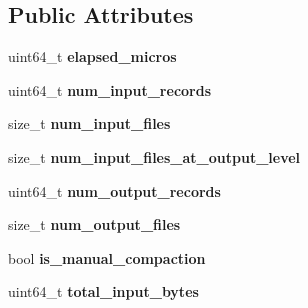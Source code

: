 \subsection*{Public Attributes}
\begin{DoxyCompactItemize}
\item 
uint64\+\_\+t {\bfseries elapsed\+\_\+micros}\hypertarget{structrocksdb_1_1CompactionJobStats_a6567d468a65804786f63cc4479be6c6f}{}\label{structrocksdb_1_1CompactionJobStats_a6567d468a65804786f63cc4479be6c6f}

\item 
uint64\+\_\+t {\bfseries num\+\_\+input\+\_\+records}\hypertarget{structrocksdb_1_1CompactionJobStats_aa59a71837c8db2b6d3fbd619d9abfa97}{}\label{structrocksdb_1_1CompactionJobStats_aa59a71837c8db2b6d3fbd619d9abfa97}

\item 
size\+\_\+t {\bfseries num\+\_\+input\+\_\+files}\hypertarget{structrocksdb_1_1CompactionJobStats_ad51b1dbb1097f47965e03a1f0df1dae0}{}\label{structrocksdb_1_1CompactionJobStats_ad51b1dbb1097f47965e03a1f0df1dae0}

\item 
size\+\_\+t {\bfseries num\+\_\+input\+\_\+files\+\_\+at\+\_\+output\+\_\+level}\hypertarget{structrocksdb_1_1CompactionJobStats_a4bd332cb2fd690781e28b45340819511}{}\label{structrocksdb_1_1CompactionJobStats_a4bd332cb2fd690781e28b45340819511}

\item 
uint64\+\_\+t {\bfseries num\+\_\+output\+\_\+records}\hypertarget{structrocksdb_1_1CompactionJobStats_a23be31caaba0bc26d62329f2d9b9da82}{}\label{structrocksdb_1_1CompactionJobStats_a23be31caaba0bc26d62329f2d9b9da82}

\item 
size\+\_\+t {\bfseries num\+\_\+output\+\_\+files}\hypertarget{structrocksdb_1_1CompactionJobStats_a28cb3dcc37534dc043e75a5218f12243}{}\label{structrocksdb_1_1CompactionJobStats_a28cb3dcc37534dc043e75a5218f12243}

\item 
bool {\bfseries is\+\_\+manual\+\_\+compaction}\hypertarget{structrocksdb_1_1CompactionJobStats_ae07cc8e438bcafbfd3fe9899dd323dde}{}\label{structrocksdb_1_1CompactionJobStats_ae07cc8e438bcafbfd3fe9899dd323dde}

\item 
uint64\+\_\+t {\bfseries total\+\_\+input\+\_\+bytes}\hypertarget{structrocksdb_1_1CompactionJobStats_a097802ababbd8561713ebdd013af291b}{}\label{structrocksdb_1_1CompactionJobStats_a097802ababbd8561713ebdd013af291b}


\end{DoxyCompactItemize}

